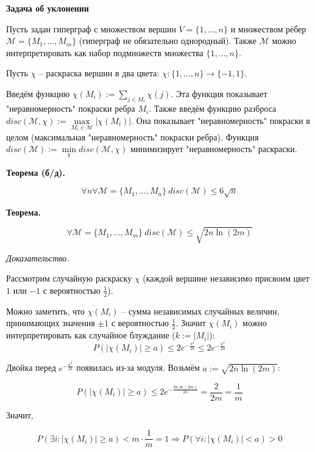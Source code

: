 \textbf{Задача об уклонении}

Пусть задан гиперграф с множеством вершин $V = \{ 1, \ldots, n \}$ и множеством рёбер
$\mathcal{M} = \{ M_1, \ldots, M_m \}$ (гиперграф не обязательно однородный). 
Также $\mathcal{M}$ можно интерпретировать как набор подмножеств 
множества $\{1, \ldots, n \}$.

Пусть $\chi$ -- раскраска вершин в два цвета:
$\chi: \{1, \ldots, n \} \to \{ -1, 1 \}$.

Введём функцию $\chi(M_i) := \sum \limits_{j \in M_i} \chi(j)$. 
Эта функция показывает "неравномерность" покраски ребра $M_i$. 
Также введём функцию разброса 
$disc(\mathcal{M}, \chi) := \max \limits_{M_i \in \mathcal{M}} \left| \chi(M_i) \right|$.
Она показывает "неравномерность" покраски в целом (максимальная "неравномерность" покраски ребра). 
Функция $disc(\mathcal{M}) := \min \limits_{\chi} disc(\mathcal{M}, \chi)$ 
минимизирует "неравномерность" раскраски.

\textbf{Теорема (б/д).}

$$
\forall n \forall \mathcal{M} = \{ M_1, \ldots, M_n \} \ 
disc(\mathcal{M}) \leqslant 6 \sqrt{n}
$$

\textbf{Теорема.}

$$
\forall \mathcal{M} = \{ M_1, \ldots, M_m \} \ 
disc(\mathcal{M}) \leqslant \sqrt{2n \ln (2m)}
$$

\textit{Доказательство.}

Рассмотрим случайную раскраску $\chi$ 
(каждой вершине независимо присвоим цвет $1$ или $-1$ с вероятностью $\frac{1}{2}$).

Можно заметить, что $\chi(M_i)$ -- сумма независимых случайных величин, 
принимающих значения $\pm 1$ с вероятностью $\frac{1}{2}$.
Значит $\chi(M_i)$ можно интерпретировать как случайное блуждание ($k := |M_i|$):
$$
P \left( \left| \chi(M_i) \right| \geqslant a \right) \leqslant
2 e^{-\frac{a^2}{2k}} \leqslant 2 e^{-\frac{a^2}{2n}}
$$

Двойка перед $e^{-\frac{a^2}{2k}}$ появилась из-за модуля. 
Возьмём $a := \sqrt{2n \ln (2m)}$:

$$
P \left( \left| \chi(M_i) \right| \geqslant a \right) \leqslant 
2 e^{-\frac{2n \ln (2m)}{2n}} = \frac{2}{2m} = \frac{1}{m}
$$

Значит, 

$$
P \left( \exists i : \left| \chi(M_i) \right| \geqslant a \right) <
m \cdot \frac{1}{m} = 1 \Rightarrow
P \left( \forall i : \left| \chi(M_i) \right| < a \right) > 0
$$